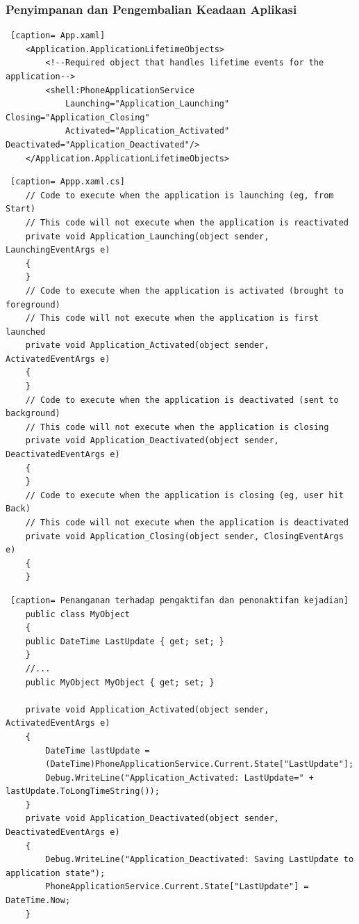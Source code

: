 \subsubsection{Penyimpanan dan Pengembalian Keadaan Aplikasi}
\label{subsubsec:Penyimpanan dan Pengembalian Keadaan Aplikasi}

\begin{lstlisting} [caption= App.xaml]
	<Application.ApplicationLifetimeObjects>
		<!--Required object that handles lifetime events for the application-->
		<shell:PhoneApplicationService
			Launching="Application_Launching" Closing="Application_Closing"
			Activated="Application_Activated" Deactivated="Application_Deactivated"/>
	</Application.ApplicationLifetimeObjects>
\end{lstlisting}

\begin{lstlisting} [caption= Appp.xaml.cs]
	// Code to execute when the application is launching (eg, from Start)
	// This code will not execute when the application is reactivated
	private void Application_Launching(object sender, LaunchingEventArgs e)
	{
	}
	// Code to execute when the application is activated (brought to foreground)
	// This code will not execute when the application is first launched
	private void Application_Activated(object sender, ActivatedEventArgs e)
	{
	}
	// Code to execute when the application is deactivated (sent to background)
	// This code will not execute when the application is closing
	private void Application_Deactivated(object sender, DeactivatedEventArgs e)
	{
	}
	// Code to execute when the application is closing (eg, user hit Back)
	// This code will not execute when the application is deactivated
	private void Application_Closing(object sender, ClosingEventArgs e)
	{
	}
\end{lstlisting}

\begin{lstlisting} [caption= Penanganan terhadap pengaktifan dan penonaktifan kejadian]
	public class MyObject
	{
	public DateTime LastUpdate { get; set; }
	}
	//...
	public MyObject MyObject { get; set; }
	
	private void Application_Activated(object sender, ActivatedEventArgs e)
	{
		DateTime lastUpdate =
		(DateTime)PhoneApplicationService.Current.State["LastUpdate"];
		Debug.WriteLine("Application_Activated: LastUpdate=" + lastUpdate.ToLongTimeString());
	}
	private void Application_Deactivated(object sender, DeactivatedEventArgs e)
	{
		Debug.WriteLine("Application_Deactivated: Saving LastUpdate to application state");
		PhoneApplicationService.Current.State["LastUpdate"] = DateTime.Now;
	}
\end{lstlisting}

